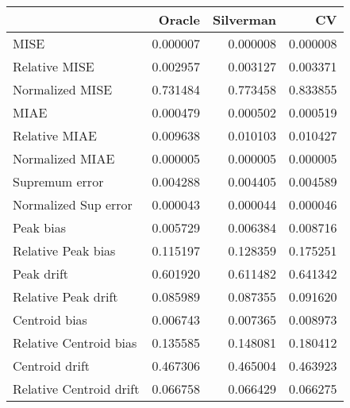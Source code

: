 \begin{tabular}{lrrr}
  \toprule
 & Oracle & Silverman & CV \\ 
  \midrule
MISE & 0.000007 & 0.000008 & 0.000008 \\ 
  Relative MISE & 0.002957 & 0.003127 & 0.003371 \\ 
  Normalized MISE & 0.731484 & 0.773458 & 0.833855 \\ 
  MIAE & 0.000479 & 0.000502 & 0.000519 \\ 
  Relative MIAE & 0.009638 & 0.010103 & 0.010427 \\ 
  Normalized MIAE & 0.000005 & 0.000005 & 0.000005 \\ 
  Supremum error & 0.004288 & 0.004405 & 0.004589 \\ 
  Normalized Sup error & 0.000043 & 0.000044 & 0.000046 \\ 
  Peak bias & 0.005729 & 0.006384 & 0.008716 \\ 
  Relative Peak bias & 0.115197 & 0.128359 & 0.175251 \\ 
  Peak drift & 0.601920 & 0.611482 & 0.641342 \\ 
  Relative Peak drift & 0.085989 & 0.087355 & 0.091620 \\ 
  Centroid bias & 0.006743 & 0.007365 & 0.008973 \\ 
  Relative Centroid bias & 0.135585 & 0.148081 & 0.180412 \\ 
  Centroid drift & 0.467306 & 0.465004 & 0.463923 \\ 
  Relative Centroid drift & 0.066758 & 0.066429 & 0.066275 \\ 
   \bottomrule
\end{tabular}

